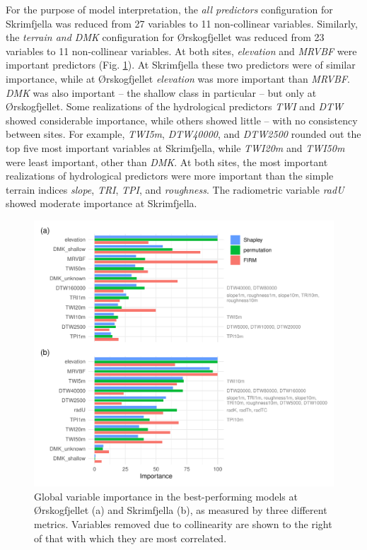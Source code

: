 \documentclass[soil, manuscript]{copernicus}
\begin{document}
For the purpose of model interpretation, the \emph{all predictors} configuration for Skrimfjella was reduced from 27 variables to 11 non-collinear variables.
Similarly, the \emph{terrain and DMK} configuration for Ørskogfjellet was reduced from 23 variables to 11 non-collinear variables.
At both sites, \emph{elevation} and \emph{MRVBF} were important predictors (Fig. \ref{fig:varImp}).
At Skrimfjella these two predictors were of similar importance, while at Ørskogfjellet \emph{elevation} was more important than \emph{MRVBF}.
\emph{DMK} was also important -- the shallow class in particular -- but only at Ørskogfjellet.
Some realizations of the hydrological predictors \emph{TWI} and \emph{DTW} showed considerable importance, while others showed little -- with no consistency between sites.
For example, \emph{TWI5m}, \emph{DTW40000}, and \emph{DTW2500} rounded out the top five most important variables at Skrimfjella, while \emph{TWI20m} and \emph{TWI50m} were least important, other than \emph{DMK}.
At both sites, the most important realizations of hydrological predictors were more important than the simple terrain indices \emph{slope}, \emph{TRI}, \emph{TPI}, and \emph{roughness}.
The radiometric variable \emph{radU} showed moderate importance at Skrimfjella.

\begin{figure}
\centering
\includegraphics{figures/variable_importance.pdf}
\caption{\label{fig:varImp}Global variable importance in the best-performing models at Ørskogfjellet (a) and Skrimfjella (b), as measured by three different metrics. Variables removed due to collinearity are shown to the right of that with which they are most correlated.}
\end{figure}
\end{document}

